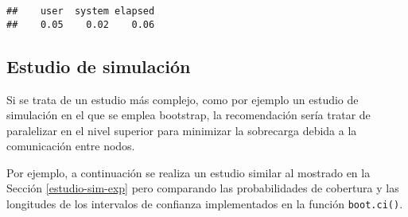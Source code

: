 \documentclass[
]{book}
\theoremstyle{break}
\theoremstyle{definition}
\theoremstyle{definition}
\theoremstyle{definition}
\theoremstyle{definition}
\theoremstyle{remark}
\begin{document}
\begin{verbatim}
##    user  system elapsed 
##    0.05    0.02    0.06
\end{verbatim}

\hypertarget{estudio-sim-boot}{%
\subsection{Estudio de simulación}\label{estudio-sim-boot}}

Si se trata de un estudio más complejo, como por ejemplo un estudio de simulación
en el que se emplea bootstrap, la recomendación sería tratar de paralelizar
en el nivel superior para minimizar la sobrecarga debida a la comunicación
entre nodos.

Por ejemplo, a continuación se realiza un estudio similar al mostrado en la Sección \ref{estudio-sim-exp}
pero comparando las probabilidades de cobertura y las longitudes de los
intervalos de confianza implementados en la función \texttt{boot.ci()}.
\end{document}
